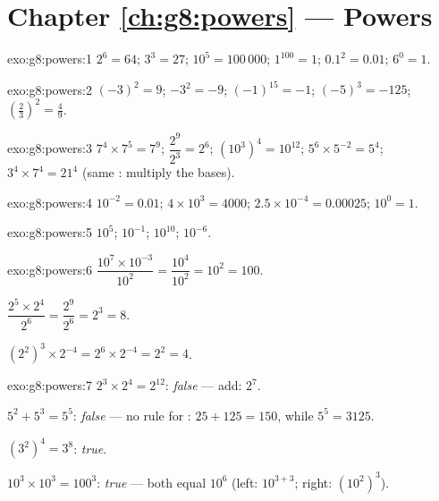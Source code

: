\section*{Chapter \ref{ch:g8:powers} --- Powers}

\begin{solution}{exo:g8:powers:1}
$2^6 = 64$; \quad $3^3 = 27$; \quad $10^5 = 100\,000$; \quad
$1^{100} = 1$; \quad $0.1^2 = 0.01$; \quad $6^0 = 1$.
\end{solution}

\begin{solution}{exo:g8:powers:2}
$(-3)^2 = 9$; \quad $-3^2 = -9$; \quad $(-1)^{15} = -1$; \quad
$(-5)^3 = -125$; \quad $\left(\frac23\right)^2 = \frac49$.
\end{solution}

\begin{solution}{exo:g8:powers:3}
$7^4 \times 7^5 = 7^9$; \quad
$\dfrac{2^9}{2^3} = 2^6$; \quad
$\left(10^3\right)^4 = 10^{12}$; \quad
$5^6 \times 5^{-2} = 5^4$; \quad
$3^4 \times 7^4 = 21^4$ (same : multiply the bases).
\end{solution}

\begin{solution}{exo:g8:powers:4}
$10^{-2} = 0.01$; \quad
$4 \times 10^3 = 4000$; \quad
$2.5 \times 10^{-4} = 0.00025$; \quad
$10^0 = 1$.
\end{solution}

\begin{solution}{exo:g8:powers:5}
$10^5$; \quad $10^{-1}$; \quad $10^{10}$; \quad $10^{-6}$.
\end{solution}

\begin{solution}{exo:g8:powers:6}
$\dfrac{10^7 \times 10^{-3}}{10^2} = \dfrac{10^4}{10^2} = 10^2 =
100$.

$\dfrac{2^5 \times 2^4}{2^6} = \dfrac{2^9}{2^6} = 2^3 = 8$.

$\left(2^2\right)^3 \times 2^{-4} = 2^6 \times 2^{-4} = 2^2 = 4$.
\end{solution}

\begin{solution}{exo:g8:powers:7}
$2^3 \times 2^4 = 2^{12}$: \emph{false} ---  add:
$2^7$.

$5^2 + 5^3 = 5^5$: \emph{false} --- no rule for :
$25 + 125 = 150$, while $5^5 = 3125$.

$(3^2)^4 = 3^8$: \emph{true}.

$10^3 \times 10^3 = 100^3$: \emph{true} --- both equal $10^6$
(left: $10^{3+3}$; right: $(10^2)^3$).
\end{solution}

